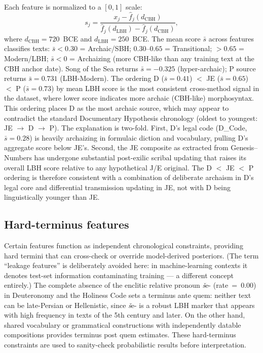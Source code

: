 \documentclass[10pt,letterpaper]{article}
\newcommand{\cbh}{CBH}
\begin{document}
Each feature is normalized to a $[0,1]$ scale:
%
\begin{equation}
  s_j = \frac{x_j - \hat{f}_j(d_{\text{CBH}})}{
    \hat{f}_j(d_{\text{LBH}}) - \hat{f}_j(d_{\text{CBH}})},
  \label{eq:lbh_score}
\end{equation}
%
where $d_{\text{CBH}} = 720$~BCE and $d_{\text{LBH}} = 250$~BCE.  The
mean score $\bar{s}$ across features classifies texts: $\bar{s} < 0.30$
= Archaic/SBH; $0.30$--$0.65$ = Transitional; $> 0.65$ = Modern/LBH;
$\bar{s} < 0$ = Archaizing (more CBH-like than any training text at
the \cbh{} anchor date).  Song of the Sea returns $\bar{s} = -0.325$
(hyper-archaic); P source returns $\bar{s} = 0.731$ (LBH-Modern).  The
ordering D ($\bar{s} = 0.41$) $<$ JE ($\bar{s} = 0.65$) $<$ P
($\bar{s} = 0.73$) by mean LBH score is the most consistent cross-method
signal in the dataset, where lower score indicates more archaic (CBH-like)
morphosyntax.  This ordering places D as the most archaic source, which
may appear to contradict the standard Documentary Hypothesis chronology
(oldest to youngest: JE $\to$ D $\to$ P).  The explanation is two-fold.
First, D's legal code (D\_Code, $\bar{s} = 0.28$) is heavily archaizing
in formulaic diction and vocabulary, pulling D's aggregate score below
JE's.  Second, the JE composite as extracted from Genesis--Numbers has
undergone substantial post-exilic scribal updating that raises its overall
LBH score relative to any hypothetical J/E original.  The D $<$ JE $<$ P
ordering is therefore consistent with a combination of deliberate archaism
in D's legal core and differential transmission updating in JE, not with
D being linguistically younger than JE.

\subsection*{Hard-terminus features}

Certain features function as independent chronological constraints,
providing hard termini that can cross-check or override model-derived
posteriors.  (The term ``leakage features'' is deliberately avoided here: in
machine-learning contexts it denotes test-set information contaminating
training --- a different concept entirely.)  The complete absence of
the enclitic relative pronoun \textit{š}e- (rate~=~0.00) in Deuteronomy
and the Holiness Code sets a terminus ante quem: neither text can be
late-Persian or Hellenistic, since \textit{š}e- is a robust LBH marker
that appears with high frequency in texts of the 5th century and later.
On the other hand, shared vocabulary or grammatical constructions with
independently datable compositions provides terminus post quem estimates.
These hard-terminus constraints are used to sanity-check probabilistic
results before interpretation.
\end{document}
